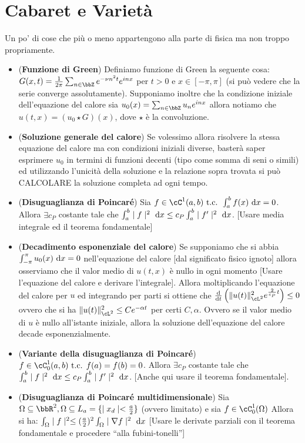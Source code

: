 \documentclass[a4paper,NoNotes,GeneralMath]{stdmdoc}
\newcommand{\intpie}{\int_{-\pi}^\pi }
\newcommand{\fractopie}{\frac{1}{2\pi}}
\begin{document}
        \section*{Cabaret e Varietà}
        Un po' di cose che più o meno appartengono alla parte di fisica ma non troppo propriamente.
        \begin{itemize}
        \item ({\bf Funzione di Green}) Definiamo funzione di Green la seguente cosa: $G(x, t) = \fractopie \sum_{n \in \bbZ} e^{-\nu n^2 t} e^{inx}$ per $t > 0$ e $x \in [-\pi, \pi]$ (si può vedere che la serie converge assolutamente). Supponiamo inoltre che la condizione iniziale dell'equazione del calore sia $u_0(x) = \sum_{n \in \bbZ} u_n e^{inx}$ allora notiamo che $u(t, x) = (u_0 \star G)(x)$, dove $\star$ è la convoluzione.
        \item ({\bf Soluzione generale del calore}) Se volessimo allora risolvere la stessa equazione del calore ma con condizioni iniziali diverse, basterà saper esprimere $u_0$ in termini di funzioni decenti (tipo come somma di seni o simili) ed utilizzando l'unicità della soluzione e la relazione sopra trovata si può CALCOLARE la soluzione completa ad ogni tempo.
        \item ({\bf Disuguaglianza di Poincaré}) Sia $f \in \cC^1(a,b) \tc \int_a^b f(x) \de x = 0$. Allora $\exists c_P$ costante tale che $\int_a^b \abs{f}^2 \de x \le c_P \int_a^b \abs{f'}^2 \de x$. [Usare media integrale ed il teorema fondamentale]
        \item ({\bf Decadimento esponenziale del calore}) Se supponiamo che si abbia $\intpie u_0(x) \de x = 0$ nell'equazione del calore [dal significato fisico ignoto] allora osserviamo che il valor medio di $u(t,x)$ è nullo in ogni momento [Usare l'equazione del calore e derivare l'integrale]. Allora moltiplicando l'equazione del calore per $u$ ed integrando per parti si ottiene che $\de{}{t} \left( \norm{u(t)}^2_{\cL^2} e^{\frac{2}{c_P}t} \right) \le 0$ ovvero che si ha $\norm{u(t)}^2_{\cL^2} \le C e^{-\alpha t}$ per certi $C, \alpha$. Ovvero se il valor medio di $u$ è nullo all'istante iniziale, allora la soluzione dell'equazione del calore decade esponenzialmente.
        \item ({\bf Variante della disuguaglianza di Poincaré}) $f \in \cC^1_0(a, b) \tc f(a) = f(b) = 0$. Allora $\exists c_P$ costante tale che $\int_a^b \abs{f}^2 \de x \le c_P \int_a^b \abs{f'}^2 \de x$. [Anche qui usare il teorema fondamentale].
        \item ({\bf Disuguaglianza di Poincaré multidimensionale}) Sia $\Omega \subseteq \bbR^2, \Omega \subseteq L_a = \{ \abs{x_d} < \frac{a}{2} \}$ (ovvero limitato) e sia $f \in \cC^1_0(\Omega)$ Allora si ha: $ \int_\Omega \abs{f}^2 \le (\frac{a}{2})^2 \int_\Omega \abs{\nabla f}^2 \de x $ [Usare le derivate parziali con il teorema fondamentale e procedere ``alla fubini-tonelli'']
        \end{itemize}
        
\end{document}
